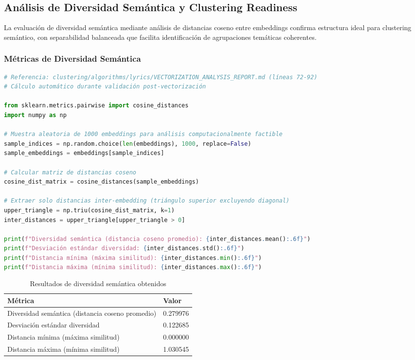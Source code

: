 \documentclass[12pt,a4paper]{article}
\begin{document}
\subsection{Análisis de Diversidad Semántica y Clustering Readiness}

La evaluación de diversidad semántica mediante análisis de distancias coseno entre embeddings confirma estructura ideal para clustering semántico, con separabilidad balanceada que facilita identificación de agrupaciones temáticas coherentes.

\subsubsection{Métricas de Diversidad Semántica}

\begin{lstlisting}[language=Python, caption={Análisis de distancias coseno inter-embedding}]
# Referencia: clustering/algorithms/lyrics/VECTORIZATION_ANALYSIS_REPORT.md (líneas 72-92)
# Cálculo automático durante validación post-vectorización

from sklearn.metrics.pairwise import cosine_distances
import numpy as np

# Muestra aleatoria de 1000 embeddings para análisis computacionalmente factible
sample_indices = np.random.choice(len(embeddings), 1000, replace=False)
sample_embeddings = embeddings[sample_indices]

# Calcular matriz de distancias coseno
cosine_dist_matrix = cosine_distances(sample_embeddings)

# Extraer solo distancias inter-embedding (triángulo superior excluyendo diagonal)
upper_triangle = np.triu(cosine_dist_matrix, k=1)
inter_distances = upper_triangle[upper_triangle > 0]

print(f"Diversidad semántica (distancia coseno promedio): {inter_distances.mean():.6f}")
print(f"Desviación estándar diversidad: {inter_distances.std():.6f}")
print(f"Distancia mínima (máxima similitud): {inter_distances.min():.6f}")
print(f"Distancia máxima (mínima similitud): {inter_distances.max():.6f}")
\end{lstlisting}

\begin{table}[h]
\centering
\caption{Resultados de diversidad semántica obtenidos}
\begin{tabular}{@{}ll@{}}
\toprule
\textbf{Métrica} & \textbf{Valor} \\
\midrule
Diversidad semántica (distancia coseno promedio) & 0.279976 \\
Desviación estándar diversidad & 0.122685 \\
Distancia mínima (máxima similitud) & 0.000000 \\
Distancia máxima (mínima similitud) & 1.030545 \\
\bottomrule
\end{tabular}
\end{table}
\end{document}
